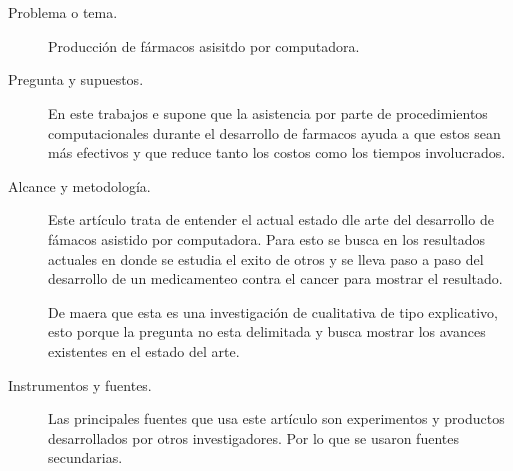 \documentclass[10pt]{beamer}
\begin{document}
\section{\cite{inv 2}}
	\begin{frame}{\cite{inv 2}}
		\begin{description}
			\item[Problema o tema.] Producción de fármacos asisitdo por computadora.
			\item[Pregunta y supuestos.] En este trabajos e supone que la asistencia por parte de procedimientos computacionales durante el desarrollo de farmacos ayuda a que estos sean más efectivos y que reduce tanto los costos como los tiempos involucrados.
		\end{description}
	\end{frame}
	
	\begin{frame}{\cite{inv 2}}
		\begin{description}
			\item[Alcance y metodología.] Este artículo trata de entender el actual estado dle arte del desarrollo de fámacos asistido por computadora. Para esto se busca en los resultados actuales en donde se estudia el exito de otros y se lleva paso a paso del desarrollo de un medicamenteo contra el cancer para mostrar el resultado.
			\par De maera que esta es una investigación de cualitativa de tipo explicativo, esto porque la pregunta no esta delimitada y busca mostrar los avances existentes en el estado del arte.
			\item[Instrumentos y fuentes.] Las principales fuentes que usa este artículo son experimentos y productos desarrollados por otros investigadores. Por lo que se usaron fuentes secundarias.
		\end{description}
		
	\end{frame}
\end{document}
